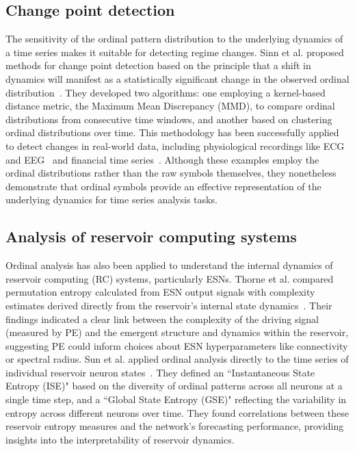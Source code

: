\subsection{Change point detection}
The sensitivity of the ordinal pattern distribution to the underlying dynamics of a time series makes it suitable for detecting regime changes. Sinn et al. proposed methods for change point detection based on the principle that a shift in dynamics will manifest as a statistically significant change in the observed ordinal distribution~\cite{sinn_2012}. They developed two algorithms: one employing a kernel-based distance metric, the Maximum Mean Discrepancy (MMD), to compare ordinal distributions from consecutive time windows, and another based on clustering ordinal distributions over time. This methodology has been successfully applied to detect changes in real-world data, including physiological recordings like ECG and EEG~\cite{sinn_2012} and financial time series~\cite{zanin_2013}. Although these examples employ the ordinal distributions rather than the raw symbols themselves, they nonetheless demonstrate that ordinal symbols provide an effective representation of the underlying dynamics for time series analysis tasks. 

\subsection{Analysis of reservoir computing systems}
Ordinal analysis has also been applied to understand the internal dynamics of reservoir computing (RC) systems, particularly ESNs. Thorne et al.  compared permutation entropy calculated from ESN output signals with complexity estimates derived directly from the reservoir's internal state dynamics~\cite{thorne_2022}. Their findings indicated a clear link between the complexity of the driving signal (measured by PE) and the emergent structure and dynamics within the reservoir, suggesting PE could inform choices about ESN hyperparameters like connectivity or spectral radius. Sun et al. applied ordinal analysis directly to the time series of individual reservoir neuron states~\cite{sun_2022}. They defined an ``Instantaneous State Entropy (ISE)" based on the diversity of ordinal patterns across all neurons at a single time step, and a ``Global State Entropy (GSE)" reflecting the variability in entropy across different neurons over time. They found correlations between these reservoir entropy measures and the network's forecasting performance, providing insights into the interpretability of reservoir dynamics.


